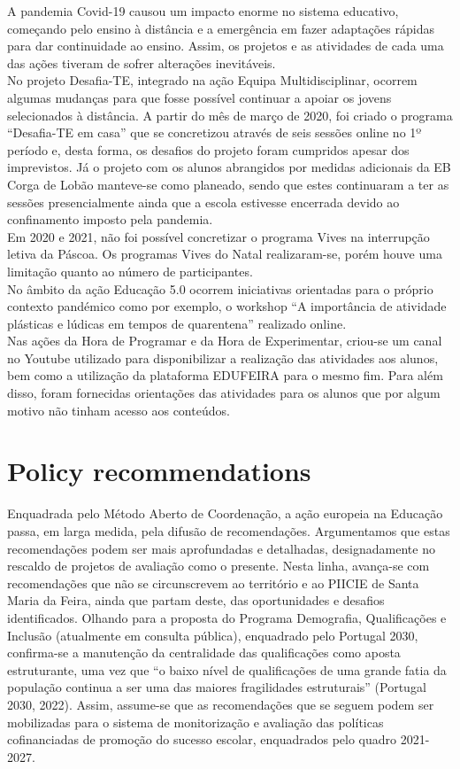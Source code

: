\documentclass[
]{book}
\begin{document}
A pandemia Covid-19 causou um impacto enorme no sistema educativo, começando pelo ensino à distância e a emergência em fazer adaptações rápidas para dar continuidade ao ensino. Assim, os projetos e as atividades de cada uma das ações tiveram de sofrer alterações inevitáveis.\\
No projeto Desafia-TE, integrado na ação Equipa Multidisciplinar, ocorrem algumas mudanças para que fosse possível continuar a apoiar os jovens selecionados à distância. A partir do mês de março de 2020, foi criado o programa ``Desafia-TE em casa'' que se concretizou através de seis sessões online no 1º período e, desta forma, os desafios do projeto foram cumpridos apesar dos imprevistos. Já o projeto com os alunos abrangidos por medidas adicionais da EB Corga de Lobão manteve-se como planeado, sendo que estes continuaram a ter as sessões presencialmente ainda que a escola estivesse encerrada devido ao confinamento imposto pela pandemia.\\
Em 2020 e 2021, não foi possível concretizar o programa Vives na interrupção letiva da Páscoa. Os programas Vives do Natal realizaram-se, porém houve uma limitação quanto ao número de participantes.\\
No âmbito da ação Educação 5.0 ocorrem iniciativas orientadas para o próprio contexto pandémico como por exemplo, o workshop ``A importância de atividade plásticas e lúdicas em tempos de quarentena'' realizado online.\\
Nas ações da Hora de Programar e da Hora de Experimentar, criou-se um canal no Youtube utilizado para disponibilizar a realização das atividades aos alunos, bem como a utilização da plataforma EDUFEIRA para o mesmo fim. Para além disso, foram fornecidas orientações das atividades para os alunos que por algum motivo não tinham acesso aos conteúdos.

\hypertarget{policy-recommendations}{%
\chapter{Policy recommendations}\label{policy-recommendations}}

Enquadrada pelo Método Aberto de Coordenação, a ação europeia na Educação passa, em larga medida, pela difusão de recomendações. Argumentamos que estas recomendações podem ser mais aprofundadas e detalhadas, designadamente no rescaldo de projetos de avaliação como o presente. Nesta linha, avança-se com recomendações que não se circunscrevem ao território e ao PIICIE de Santa Maria da Feira, ainda que partam deste, das oportunidades e desafios identificados.
Olhando para a proposta do Programa Demografia, Qualificações e Inclusão (atualmente em consulta pública), enquadrado pelo Portugal 2030, confirma-se a manutenção da centralidade das qualificações como aposta estruturante, uma vez que ``o baixo nível de qualificações de uma grande fatia da população continua a ser uma das maiores fragilidades estruturais'' (Portugal 2030, 2022). Assim, assume-se que as recomendações que se seguem podem ser mobilizadas para o sistema de monitorização e avaliação das políticas cofinanciadas de promoção do sucesso escolar, enquadrados pelo quadro 2021-2027.
\end{document}
